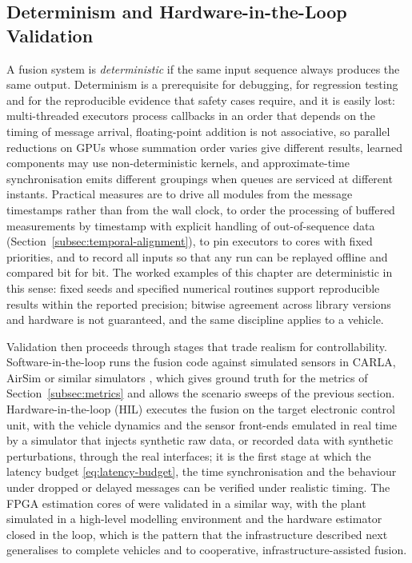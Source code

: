 \subsection{Determinism and Hardware-in-the-Loop Validation}
\label{subsec:hil}

A fusion system is \emph{deterministic} if the same input sequence always produces the same output. Determinism is a prerequisite for debugging, for regression testing and for the reproducible evidence that safety cases require, and it is easily lost: multi-threaded executors process callbacks in an order that depends on the timing of message arrival, floating-point addition is not associative, so parallel reductions on GPUs whose summation order varies give different results, learned components may use non-deterministic kernels, and approximate-time synchronisation emits different groupings when queues are serviced at different instants. Practical measures are to drive all modules from the message timestamps rather than from the wall clock, to order the processing of buffered measurements by timestamp with explicit handling of out-of-sequence data (Section~\ref{subsec:temporal-alignment}), to pin executors to cores with fixed priorities, and to record all inputs so that any run can be replayed offline and compared bit for bit. The worked examples of this chapter are deterministic in this sense: fixed seeds and specified numerical routines support reproducible results within the reported precision; bitwise agreement across library versions and hardware is not guaranteed, and the same discipline applies to a vehicle.

Validation then proceeds through stages that trade realism for controllability. Software-in-the-loop runs the fusion code against simulated sensors in CARLA, AirSim or similar simulators \cite{dosovitskiy_carla_2017,shah_airsim_2017}, which gives ground truth for the metrics of Section~\ref{subsec:metrics} and allows the scenario sweeps of the previous section. Hardware-in-the-loop (HIL) executes the fusion on the target electronic control unit, with the vehicle dynamics and the sensor front-ends emulated in real time by a simulator that injects synthetic raw data, or recorded data with synthetic perturbations, through the real interfaces; it is the first stage at which the latency budget \eqref{eq:latency-budget}, the time synchronisation and the behaviour under dropped or delayed messages can be verified under realistic timing. The FPGA estimation cores of \cite{deliparaschos2016_jee_fpga} were validated in a similar way, with the plant simulated in a high-level modelling environment and the hardware estimator closed in the loop, which is the pattern that the infrastructure described next generalises to complete vehicles and to cooperative, infrastructure-assisted fusion.

